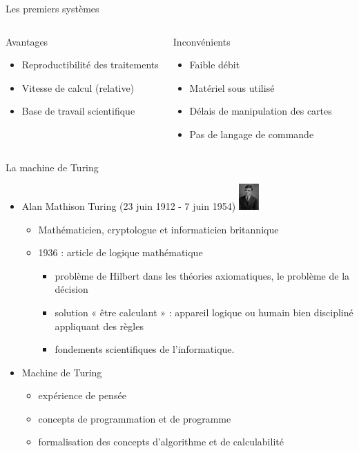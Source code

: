 \begin{frame}{Les premiers systèmes}
\begin{columns}
\begin{block}{Avantages}
\begin{itemize}
\item Reproductibilité des traitements
\item Vitesse de calcul (relative)
\item Base de travail scientifique
\end{itemize}
\end{block}
\begin{block}{Inconvénients}
\begin{itemize}
\item Faible débit
\item Matériel sous utilisé
\item Délais de manipulation des cartes
\item Pas de langage de commande
\end{itemize}
\end{block}
\end{columns}
\end{frame}

\begin{frame}{La machine de Turing \cite{wp-turing}}
\begin{itemize}
\item Alan Mathison Turing (23 juin 1912 - 7 juin 1954) \includegraphics[height=1cm]{../illustration/Alan_Turing_Aged_16.jpg}
\begin{itemize}
\item Mathématicien, cryptologue et informaticien britannique
\item 1936 : article de logique mathématique
\begin{itemize}
\item problème de Hilbert dans les théories axiomatiques, le problème de la décision
\item solution « être calculant » : appareil logique ou humain bien discipliné appliquant des règles
\item fondements scientifiques de l'informatique.
\end{itemize}

\end{itemize}
\item Machine de Turing
\begin{itemize}
\item expérience de pensée
\item concepts de programmation et de programme
\item formalisation des concepts d'algorithme et de calculabilité
\end{itemize}

\end{itemize}

\end{frame}

